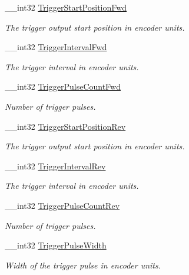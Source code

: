 \begin{DoxyCompactItemize}
\item 
\+\_\+\+\_\+int32 \hyperlink{struct_k_m_o_t___trigger_params_a2ac8be83d5cb5e055ad156bed5d546f0}{Trigger\+Start\+Position\+Fwd}
\begin{DoxyCompactList}\small\item\em The trigger output start position in encoder units. \end{DoxyCompactList}\item 
\+\_\+\+\_\+int32 \hyperlink{struct_k_m_o_t___trigger_params_ad03bb4ac9af814270bd4625167f93c8b}{Trigger\+Interval\+Fwd}
\begin{DoxyCompactList}\small\item\em The trigger interval in encoder units. \end{DoxyCompactList}\item 
\+\_\+\+\_\+int32 \hyperlink{struct_k_m_o_t___trigger_params_a95ca64abd5c0b10363ceacaef64d457f}{Trigger\+Pulse\+Count\+Fwd}
\begin{DoxyCompactList}\small\item\em Number of trigger pulses. \end{DoxyCompactList}\item 
\+\_\+\+\_\+int32 \hyperlink{struct_k_m_o_t___trigger_params_a6ac0dd07410aa1a60d7fc28f26856705}{Trigger\+Start\+Position\+Rev}
\begin{DoxyCompactList}\small\item\em The trigger output start position in encoder units. \end{DoxyCompactList}\item 
\+\_\+\+\_\+int32 \hyperlink{struct_k_m_o_t___trigger_params_a0a47def826b778a9df1b44a4dd1d5308}{Trigger\+Interval\+Rev}
\begin{DoxyCompactList}\small\item\em The trigger interval in encoder units. \end{DoxyCompactList}\item 
\+\_\+\+\_\+int32 \hyperlink{struct_k_m_o_t___trigger_params_a6d7852bb11b5cd67aa50fb846b8669b4}{Trigger\+Pulse\+Count\+Rev}
\begin{DoxyCompactList}\small\item\em Number of trigger pulses. \end{DoxyCompactList}\item 
\+\_\+\+\_\+int32 \hyperlink{struct_k_m_o_t___trigger_params_ac7e5764e2dce32833db1cf051e9702a8}{Trigger\+Pulse\+Width}
\begin{DoxyCompactList}\small\item\em Width of the trigger pulse in encoder units. \end{DoxyCompactList}\item 

\end{DoxyCompactItemize}
